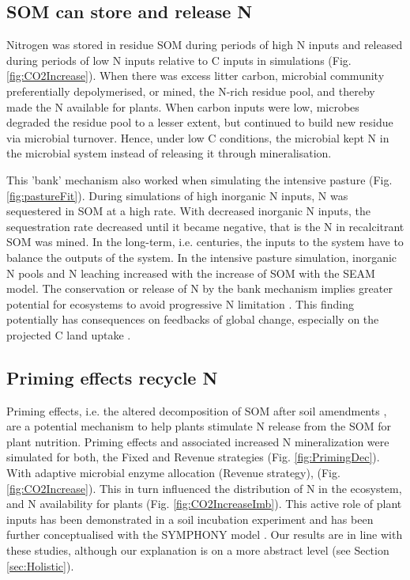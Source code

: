 \subsection{SOM can store and release N}
Nitrogen was stored in residue SOM during periods of high N inputs and
released during periods of low N inputs relative to C inputs in simulations
(Fig.
\ref{fig:CO2Increase}). When there was excess litter carbon, microbial community
preferentially depolymerised, or mined, the N-rich residue pool, and thereby
made the N available for plants. When carbon inputs were low, microbes degraded the
residue pool to a lesser extent, but continued to build new residue via microbial turnover.
Hence, under low C conditions, the microbial kept N in the microbial system instead of releasing it through mineralisation. 

This 'bank' mechanism \citep[sensu][]{Perveen14} also worked when simulating the
intensive pasture (Fig. \ref{fig:pastureFit}). During simulations of high
inorganic N inputs, N was sequestered in SOM at a high rate. With decreased
inorganic N inputs, the sequestration rate decreased until it became negative,
that is the N in recalcitrant SOM was mined. In the long-term, i.e. centuries,
the inputs to the system have to balance the outputs of the system. In the
intensive pasture simulation, inorganic N pools and N leaching increased with
the increase of SOM with the SEAM model. The conservation or release of N by the
bank mechanism implies greater potential for ecosystems to avoid progressive N
limitation \citep{Norby10, Franklin14, Averill15}. This finding
potentially has consequences on feedbacks of global change, especially on the
projected C land uptake \citep{Friedlingstein14}.

\subsection{Priming effects recycle N}
Priming effects, i.e. the altered decomposition of SOM after soil amendments
\citep{Kuzyakov00}, are a potential mechanism to help plants stimulate N release
from the SOM for plant nutrition.
Priming effects and associated increased N mineralization were simulated for
both, the Fixed and Revenue strategies (Fig. \ref{fig:PrimingDec}). With
adaptive microbial enzyme allocation (Revenue strategy),  (Fig.
\ref{fig:CO2Increase}).
This in turn influenced the distribution of N in the ecosystem, and N
availability for plants (Fig.
\ref{fig:CO2IncreaseImb}). This active role of plant inputs has been
demonstrated in a soil incubation experiment \citep{Fontaine11} and has been
further conceptualised with the SYMPHONY model \citep{Perveen14}. Our results
are in line with these studies, although our explanation is on a more abstract
level (see Section \ref{sec:Holistic}). 

